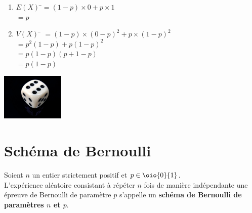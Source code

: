 \documentclass[a4paper,11pt,cours]{nsi} %
\begin{document}
\begin{demonstration}
    \begin{enumerate}[label=\textbullet]
        \item \begin{tabbing}
            $E(X)$  \=$=(1-p)\times 0+p\times 1$\\
            \>  $=p$
        \end{tabbing}
\newpage
        \item \begin{tabbing}
            $V(X)$  \=  $=(1-p)\times (0-p)^2+p\times (1-p)^2$\\
            \>  $=p^2(1-p)+p(1-p)^2$\\
            \>  $=p(1-p)(p+1-p)$\\
            \>  $=p(1-p)$
        \end{tabbing}
    \end{enumerate}
\end{demonstration}

{\includegraphics[width=3cm]{dice-689617_640.jpg}}


\section{Schéma de Bernoulli}
\begin{definition}[]
    Soient $n$ un entier strictement positif et $p\in\oio{0}{1}$.\\
    L'expérience aléatoire consistant à répéter $n$ fois de manière indépendante une épreuve de Bernoulli de paramètre $p$ s'appelle un \textbf{schéma de Bernoulli de paramètres $n$ et $p$}.
\end{definition}
\end{document}

